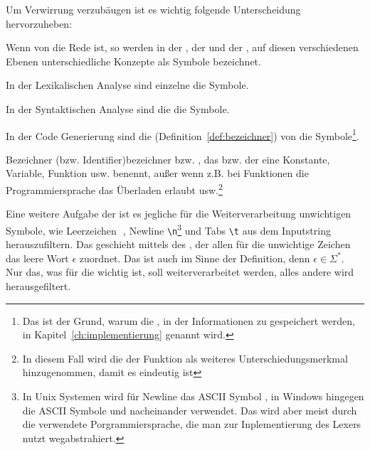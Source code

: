 \begin{Special_Paragraph}
  Um Verwirrung verzubäugen ist es wichtig folgende Unterscheidung hervorzuheben:

  Wenn von  die Rede ist, so werden in der , der  und der , auf diesen verschiedenen Ebenen unterschiedliche Konzepte als Symbole bezeichnet.

  In der Lexikalischen Analyse sind einzelne  die Symbole.

  In der Syntaktischen Analyse sind die  die Symbole.

  In der Code Generierung sind die  (Definition~\ref{def:bezeichner}) von  die Symbole\footnote{Das ist der Grund, warum die , in der Informationen zu  gespeichert werden, in Kapitel~\ref{ch:implementierung}  genannt wird.}.
\end{Special_Paragraph}

\begin{Definition}{Bezeichner (bzw. Identifier)}{bezeichner}
   bzw. , das bzw. der eine Konstante, Variable, Funktion usw.  benennt, außer wenn z.B. bei Funktionen die Programmiersprache das Überladen erlaubt usw.\footnote{In diesem Fall wird die  der Funktion als weiteres Unterschiedungsmerkmal hinzugenommen, damit es eindeutig ist}
\end{Definition}

Eine weitere Aufgabe der  ist es jegliche für die Weiterverarbeitung unwichtigen Symbole, wie Leerzeichen \,\textvisiblespace\,, Newline \verb|\n|\footnote{In Unix Systemen wird für Newline das ASCII Symbol , in Windows hingegen die ASCII Symbole  und  nacheinander verwendet. Das wird aber meist durch die verwendete Porgrammiersprache, die man zur Inplementierung des Lexers nutzt wegabstrahiert.} und Tabs \verb|\t| aus dem Inputstring herauszufiltern. Das geschieht mittels des , der allen für die  unwichtige Zeichen das leere Wort $\epsilon$ zuordnet. Das ist auch im Sinne der Definition, denn $\epsilon \in \Sigma^{*}$.
Nur das, was für die  wichtig ist, soll weiterverarbeitet werden, alles andere wird herausgefiltert.

